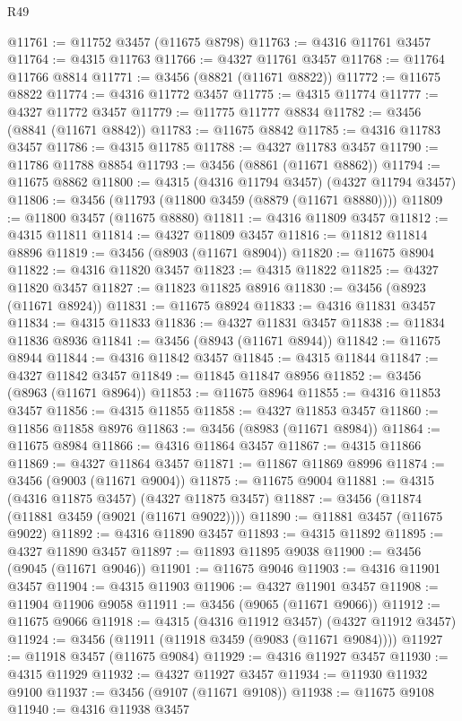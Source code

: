 \begin{lexlean}{R49}
\begin{coremodule}
@11761 := @11752 @3457 (@11675 @8798)
@11763 := @4316 @11761 @3457
@11764 := @4315 @11763
@11766 := @4327 @11761 @3457
@11768 := @11764 @11766 @8814
@11771 := @3456 (@8821 (@11671 @8822))
@11772 := @11675 @8822
@11774 := @4316 @11772 @3457
@11775 := @4315 @11774
@11777 := @4327 @11772 @3457
@11779 := @11775 @11777 @8834
@11782 := @3456 (@8841 (@11671 @8842))
@11783 := @11675 @8842
@11785 := @4316 @11783 @3457
@11786 := @4315 @11785
@11788 := @4327 @11783 @3457
@11790 := @11786 @11788 @8854
@11793 := @3456 (@8861 (@11671 @8862))
@11794 := @11675 @8862
@11800 := @4315 (@4316 @11794 @3457) (@4327 @11794 @3457)
@11806 := @3456 (@11793 (@11800 @3459 (@8879 (@11671 @8880))))
@11809 := @11800 @3457 (@11675 @8880)
@11811 := @4316 @11809 @3457
@11812 := @4315 @11811
@11814 := @4327 @11809 @3457
@11816 := @11812 @11814 @8896
@11819 := @3456 (@8903 (@11671 @8904))
@11820 := @11675 @8904
@11822 := @4316 @11820 @3457
@11823 := @4315 @11822
@11825 := @4327 @11820 @3457
@11827 := @11823 @11825 @8916
@11830 := @3456 (@8923 (@11671 @8924))
@11831 := @11675 @8924
@11833 := @4316 @11831 @3457
@11834 := @4315 @11833
@11836 := @4327 @11831 @3457
@11838 := @11834 @11836 @8936
@11841 := @3456 (@8943 (@11671 @8944))
@11842 := @11675 @8944
@11844 := @4316 @11842 @3457
@11845 := @4315 @11844
@11847 := @4327 @11842 @3457
@11849 := @11845 @11847 @8956
@11852 := @3456 (@8963 (@11671 @8964))
@11853 := @11675 @8964
@11855 := @4316 @11853 @3457
@11856 := @4315 @11855
@11858 := @4327 @11853 @3457
@11860 := @11856 @11858 @8976
@11863 := @3456 (@8983 (@11671 @8984))
@11864 := @11675 @8984
@11866 := @4316 @11864 @3457
@11867 := @4315 @11866
@11869 := @4327 @11864 @3457
@11871 := @11867 @11869 @8996
@11874 := @3456 (@9003 (@11671 @9004))
@11875 := @11675 @9004
@11881 := @4315 (@4316 @11875 @3457) (@4327 @11875 @3457)
@11887 := @3456 (@11874 (@11881 @3459 (@9021 (@11671 @9022))))
@11890 := @11881 @3457 (@11675 @9022)
@11892 := @4316 @11890 @3457
@11893 := @4315 @11892
@11895 := @4327 @11890 @3457
@11897 := @11893 @11895 @9038
@11900 := @3456 (@9045 (@11671 @9046))
@11901 := @11675 @9046
@11903 := @4316 @11901 @3457
@11904 := @4315 @11903
@11906 := @4327 @11901 @3457
@11908 := @11904 @11906 @9058
@11911 := @3456 (@9065 (@11671 @9066))
@11912 := @11675 @9066
@11918 := @4315 (@4316 @11912 @3457) (@4327 @11912 @3457)
@11924 := @3456 (@11911 (@11918 @3459 (@9083 (@11671 @9084))))
@11927 := @11918 @3457 (@11675 @9084)
@11929 := @4316 @11927 @3457
@11930 := @4315 @11929
@11932 := @4327 @11927 @3457
@11934 := @11930 @11932 @9100
@11937 := @3456 (@9107 (@11671 @9108))
@11938 := @11675 @9108
@11940 := @4316 @11938 @3457

\end{coremodule}
\end{lexlean}
